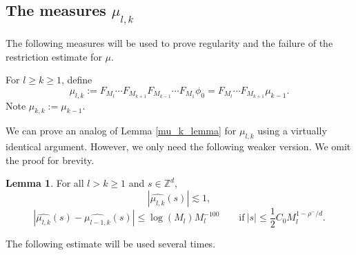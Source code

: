 \documentclass{amsart}
\numberwithin{equation}{section}
\theoremstyle{definition}
\newtheorem{lemma}[theorem]{Lemma}
\theoremstyle{definition}
\def\ZZ{\mathbb{Z}}
\begin{document}
\subsection{The measures \texorpdfstring{$\mu_{l,k}$}{mul,k}}

The following measures will be used to prove regularity and the failure of the restriction estimate for $\mu$.   

For $ l \geq k \geq 1$, define $$\mu_{l,k} 
:=  
F_{M_l} \cdots F_{M_{k+1}} F_{M_{k-1}} \cdots F_{M_1} \phi_0
= F_{M_l} \cdots F_{M_{k+1}} \mu_{k-1}. 
$$
Note $\mu_{k,k} := \mu_{k-1}$. 

We can prove an analog of Lemma \ref{mu_k_lemma} for $\mu_{l,k}$ using a virtually identical argument. However, we only need the following weaker version. We omit the proof for brevity. 





\begin{lemma}\label{mu_k_ell_lemma}
For all $l > k \geq 1$ and $s \in \ZZ^d$, 
\begin{equation}\label{mukleq}
\left| \widehat{\mu_{l,k}} (s)  \right| \lesssim 1,  
\end{equation}
\begin{equation}\label{mukleq2}
\left| \widehat{\mu_{l,k}} (s) - \widehat{\mu_{l-1,k}}(s) \right| \leq \log(M_l)M_l^{-100} \qquad \text{if}\  |s| \leq  
\frac{1}{2}C_0 M_{l}^{1-\rho^{-}/d}.
\end{equation}
\end{lemma}


The following estimate will be used several times. 
\end{document}
